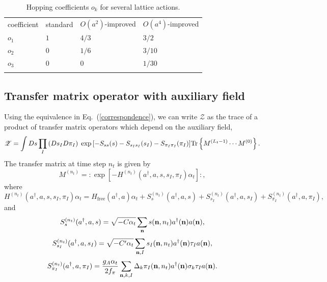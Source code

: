 \begin{table}[tbh]
\caption{Hopping coefficients $o_k$ for several lattice actions.}%
\begin{center}
\label{hopping_coeff_2}%

\begin{tabular}{p{2cm}p{3cm}p{3cm}p{3cm}}
\hline\noalign{\smallskip}
coefficient& standard & $O(a^{2})$-improved & $O(a^{4})$-improved \\
\noalign{\smallskip}\svhline\noalign{\smallskip}
$o_{1}$ & $1$ & $4/3$ & $3/2$\\
$o_{2}$ & $0$ & $1/6$ & $3/10$\\
$o_{3}$ & $0$ & $0$ & $1/30$ \\
\noalign{\smallskip}\hline\noalign{\smallskip}
\end{tabular}
\end{center}
\end{table}

\subsection{Transfer matrix operator with auxiliary field}
Using the equivalence in Eq.~(\ref{correspondence}), we can write $\mathcal{Z}$
as the trace of a product of transfer matrix operators which depend on the
auxiliary field,
\begin{equation}
\mathcal{Z} = \int Ds \prod_I \left(Ds_I D\pi_I\right) \; 
\exp{\left[-S_{ss}(s)
-S_{s_Is_I}(s_I)
-S_{\pi_I\pi_I}(\pi_I)\right]}
 {\rm Tr}\left\{ M^{(L_t-1)}\cdots M^{(0)}\right\}.
\end{equation}
The transfer matrix at time step $n_t$ is given by
\begin{equation}
M^{(n_t)}=\colon\exp\left[ -H^{(n_t)}(a^{\dagger},a,s,s_I,\pi_I)\alpha_{t}
\right]
\colon,
\end{equation}
where
\begin{equation}
H^{(n_t)}(a^{\dagger},a,s,s_I,\pi_I)\alpha_{t}=H_{\text{free}}(a^{\dagger},a)\alpha_{t}+S^{(n_t)}_s(a^{\dagger},a,s)+S^{(n_t)}_{s_I}(a^{\dagger},a,s_{I})+S^{(n_t)}_{\pi_I}(a^{\dagger},a,\pi_{I}),
\end{equation}
and
\begin{equation}
S^{(n_t)}_{s}(a^{\dagger},a,s) =  \sqrt{-C\alpha_{t}} \sum_{\bf n} s({\bf
n},n_t)a^{\dagger}({\bf
n})a({\bf n}),  
\end{equation}
\begin{equation}
S^{(n_t)}_{s_I}(a^{\dagger},a,s_{I}) = \sqrt{-C'\alpha_{t}} \sum_{{\bf n},I}
s_{I}({\bf
n},n_t)a^{\dagger}({\bf
n})\tau_Ia({\bf n}),
\end{equation}
\begin{equation}
S^{(n_t)}_{\pi_I}(a^{\dagger},a,\pi_{I}) = \frac{g_A \alpha_t}{2 f_{\pi}}
\sum_{{\bf n},k,I}
\Delta_k \pi_{I}({\bf
n},n_t)a^{\dagger}({\bf
n})\sigma_k\tau_I a({\bf n}).
\end{equation}

